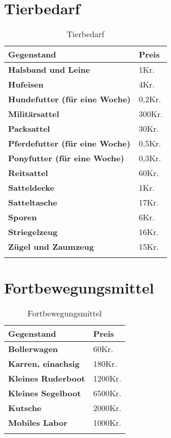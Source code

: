 \newpage
\section{Tierbedarf}
\begin{longtable}{|p{5cm}|p{2cm}|}
\hline
\textbf{Gegenstand} & \textbf{Preis} \\ \hline
\textbf{Halsband und Leine} & 1Kr. \\ \hline
\textbf{Hufeisen} & 4Kr. \\ \hline
\textbf{Hundefutter (für eine Woche)} & 0,2Kr. \\ \hline
\textbf{Militärsattel} & 300Kr. \\ \hline
\textbf{Packsattel} & 30Kr. \\ \hline
\textbf{Pferdefutter (für eine Woche)} & 0,5Kr. \\ \hline
\textbf{Ponyfutter (für eine Woche)} & 0,3Kr. \\ \hline
\textbf{Reitsattel} & 60Kr. \\ \hline
\textbf{Satteldecke} & 1Kr. \\ \hline
\textbf{Satteltasche} & 17Kr. \\ \hline
\textbf{Sporen} & 6Kr. \\ \hline
\textbf{Striegelzeug} & 16Kr. \\ \hline
\textbf{Zügel und Zaumzeug} & 15Kr. \\ \hline

\caption{Tierbedarf}
\label{tab:Tierbedarf}
\end{longtable}


\section{Fortbewegungsmittel}
\begin{longtable}{|p{5cm}|p{2cm}|}
\hline
\textbf{Gegenstand} & \textbf{Preis} \\ \hline
\textbf{Bollerwagen} & 60Kr. \\ \hline
\textbf{Karren, einachsig} & 180Kr. \\ \hline
\textbf{Kleines Ruderboot} & 1200Kr. \\ \hline
\textbf{Kleines Segelboot} & 6500Kr. \\ \hline
\textbf{Kutsche} & 2000Kr. \\ \hline
\textbf{Mobiles Labor} & 1000Kr. \\ \hline

\caption{Fortbewegungsmittel}
\label{tab:Fortbewegungsmittel}
\end{longtable}


